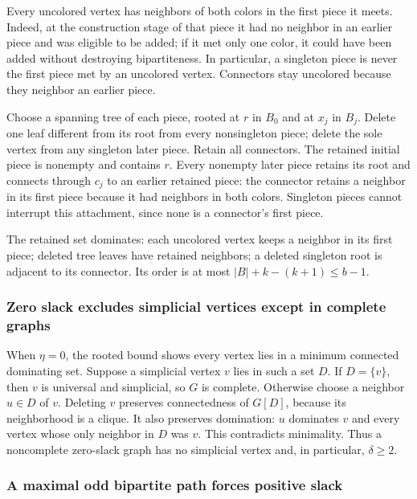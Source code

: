 \documentclass[11pt,a4paper]{article}
\theoremstyle{definition}\newtheorem{definition}[theorem]{Definition}
\theoremstyle{remark}\newtheorem{remark}[theorem]{Remark}
\begin{document}
Every uncolored vertex has neighbors of both colors in the first piece
it meets. Indeed, at the construction stage of that piece it had no
neighbor in an earlier piece and was eligible to be added; if it met
only one color, it could have been added without destroying
bipartiteness. In particular, a singleton piece is never the first piece
met by an uncolored vertex. Connectors stay uncolored because they
neighbor an earlier piece.

Choose a spanning tree of each piece, rooted at \(r\) in \(B_0\) and at
\(x_j\) in \(B_j\). Delete one leaf different from its root from every
nonsingleton piece; delete the sole vertex from any singleton later
piece. Retain all connectors. The retained initial piece is nonempty and
contains \(r\). Every nonempty later piece retains its root and connects
through \(c_j\) to an earlier retained piece: the connector retains a
neighbor in its first piece because it had neighbors in both colors.
Singleton pieces cannot interrupt this attachment, since none is a
connector's first piece.

The retained set dominates: each uncolored vertex keeps a neighbor in
its first piece; deleted tree leaves have retained neighbors; a deleted
singleton root is adjacent to its connector. Its order is at most
\(|B|+k-(k+1)\le b-1\).

\subsubsection{Zero slack excludes simplicial vertices except in
complete
graphs}\label{late:claw:zero-slack-excludes-simplicial-vertices-except-in-complete-graphs}

When \(\eta=0\), the rooted bound shows every vertex lies in a minimum
connected dominating set. Suppose a simplicial vertex \(v\) lies in such
a set \(D\). If \(D=\{v\}\), then \(v\) is universal and simplicial, so
\(G\) is complete. Otherwise choose a neighbor \(u\in D\) of \(v\).
Deleting \(v\) preserves connectedness of \(G[D]\), because its
neighborhood is a clique. It also preserves domination: \(u\) dominates
\(v\) and every vertex whose only neighbor in \(D\) was \(v\). This
contradicts minimality. Thus a noncomplete zero-slack graph has no
simplicial vertex and, in particular, \(\delta\ge2\).

\subsubsection{A maximal odd bipartite path forces positive
slack}\label{late:claw:a-maximal-odd-bipartite-path-forces-positive-slack}
\end{document}

